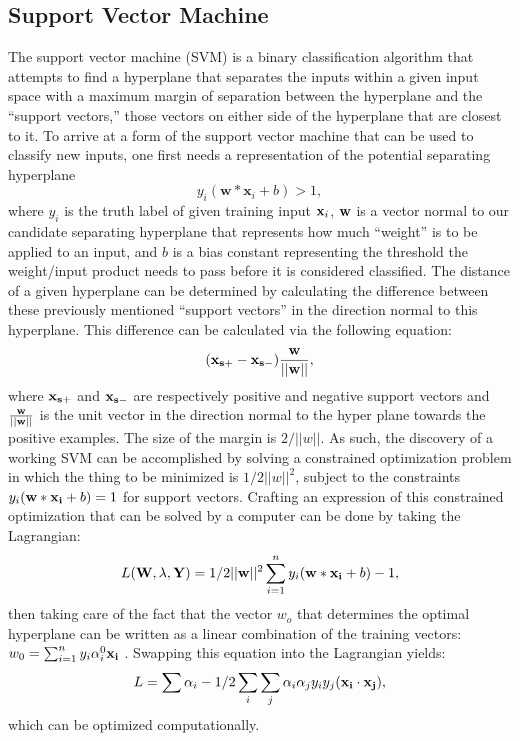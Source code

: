 \subsection{Support Vector Machine}
The support vector machine (SVM) is a binary classification algorithm that
attempts to find a hyperplane that separates the inputs within a given input
space with a maximum margin of separation between the hyperplane and the
``support vectors,'' those vectors on either side of the hyperplane
that are closest to it. To arrive at a form of the support vector machine that
can be used to classify new inputs, one first needs a representation of the
potential separating hyperplane $$y_i(\mathbf{w}*\mathbf{x}_i + b) > 1,$$ where
$y_i$ is the truth label of given training input $\bold{x}_i$, $\bold{w}$ is a vector
normal to our candidate separating hyperplane that represents how much
``weight'' is to be applied to an input, and $b$ is a bias constant representing
the threshold the weight/input product needs to pass before it is considered
classified. The distance of a given hyperplane can be determined by calculating
the difference between these previously mentioned ``support vectors'' in the
direction normal to this hyperplane. This difference can be calculated via the
following equation:
$$(\bold{x_{s+}}-\bold{x_{s-}})\bold{\frac{w}{||w||}},$$ where $\bold{x_{s+}}$
and $\bold{x_{s-}}$ are respectively positive and negative support vectors and
$\bold{\frac{w}{||w||}}$ is the unit vector in the direction normal to the hyper
plane towards the positive examples. The size of the margin is $2/||w||$. As
such, the discovery of a working SVM can be accomplished by solving a constrained
optimization problem in which the thing to be minimized is $1/2||w||^2$, subject
to the constraints $y_i(\bold{w}*\bold{x_i} + b) = 1$ for support vectors.
Crafting an expression of this constrained optimization that can be solved by a
computer can be done by taking the Lagrangian:
$$L(\bold{W},\bold{\lambda},\bold{Y}) = 1/2||\bold{w}||^2 \sum_{i=1}^{n}y_i(\bold{w}*\bold{x_i}+b)-1,$$
then taking care of the fact that the vector $w_o$ that determines the optimal
hyperplane can be written as a linear combination of the training vectors:
$w_{0}=\sum_{i=1}^{n}y_{i}\alpha_{i}^{0}\bold{x_i}$ \cite{Vapnik}. Swapping this
equation into the Lagrangian yields:
$$L = \sum \alpha_{i} - 1/2 \sum_{i}\sum_{j}\alpha_{i}\alpha_{j}y_{i}y_{j}(\bold{x_i}\cdot\bold{x_j}),$$
which can be optimized computationally.

